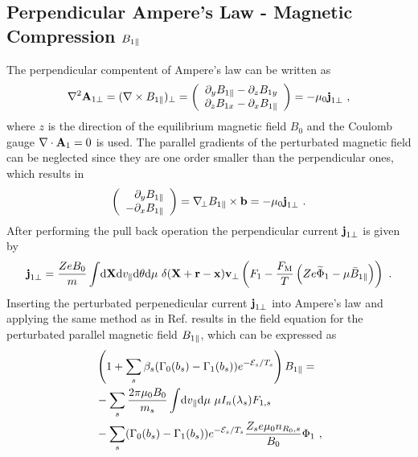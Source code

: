 \subsection{Perpendicular Ampere's Law - Magnetic Compression $B_{1\parallel}$}
\label{sub:fieldMagnetic}

The perpendicular compentent of Ampere's law can be written as 
\begin{gather}
	\nabla^2 \boldsymbol{\mathbf{A}}_{1\perp} = (\nabla \times B_{1\parallel})_\perp = \left( \begin{array}{c} \partial_y B_{1\parallel} - \partial_z B_{1 y} \\ \partial_z B_{1x} - \partial_x B_{1\parallel} \end{array} \right) = - \mu_0 \boldsymbol{\mathbf{j}}_{1 \perp}~,
	\label{eq:perpendicularAmpereLawLocal}
\end{gather}
where $z$ is the direction of the equilibrium magnetic field $B_0$ and the Coulomb gauge $\nabla \cdot \boldsymbol{\mathbf{A}}_1 = 0$ is used. The parallel gradients of the perturbated magnetic field can be neglected since they are one order smaller than the perpendicular ones, which results in
\begin{gather}
	\left( \begin{array}{r} \partial_y B_{1\parallel} \\ - \partial_x B_{1\parallel} \end{array} \right) = \nabla_{\!\perp} B_{1\parallel} \times \boldsymbol{\mathbf{b}} = - \mu_0 \boldsymbol{\mathbf{j}}_{1 \perp}~.
\end{gather}
After performing the pull back operation the perpendicular current $\boldsymbol{\mathbf{j}}_{1\perp}$ is given by 
\begin{gather}
		\boldsymbol{\mathbf{j}}_{1\perp} = \frac{Ze B_0}{m} \int \! \mathrm{d}\boldsymbol{\mathbf{X}}\mathrm{d}v_\parallel\mathrm{d}\theta\mathrm{d}\mu ~ \delta(\boldsymbol{\mathbf{X}} + \boldsymbol{\mathbf{r}} - \boldsymbol{\mathbf{x}}) \boldsymbol{\mathbf{v}}_\perp \left(F_1 - \frac{F_\mathrm{M}}{T}\left(Ze \widetilde{\Phi}_1 - \mu \bar{B}_{1\parallel}\right) \right) ~.
	\label{eq:perpendicularCurrentPullbackLocal}
\end{gather}
Inserting the perturbated perpenedicular current $\boldsymbol{\mathbf{j}}_{1 \perp}$ into Ampere's law and applying the same method as in Ref.  results in the field equation for the perturbated parallel magnetic field $B_{1\parallel}$, which can be expressed as
\begin{gather}
    \begin{aligned}
        &\left(1 + \sum_s \beta_s (\Gamma_0(b_s) - \Gamma_1(b_s)) e^{-\mathcal{E}_s/T_s}\right) B_{1\parallel} = \\
	 &- \sum_s \frac{2\pi \mu_0 B_0}{m_s} \int \! \mathrm{d}v_\parallel\mathrm{d}\mu ~ \mu I_n(\lambda_s) F_{1,s}  \\
        &- \sum_s (\Gamma_0(b_s) - \Gamma_1(b_s))e^{-\mathcal{E}_s/T_s} \frac{Z_se \mu_0 n_{R_0,s}}{B_0} \Phi_1 ~,
    \end{aligned}
    \label{eq:fieldMagneticLocal}
\end{gather}
